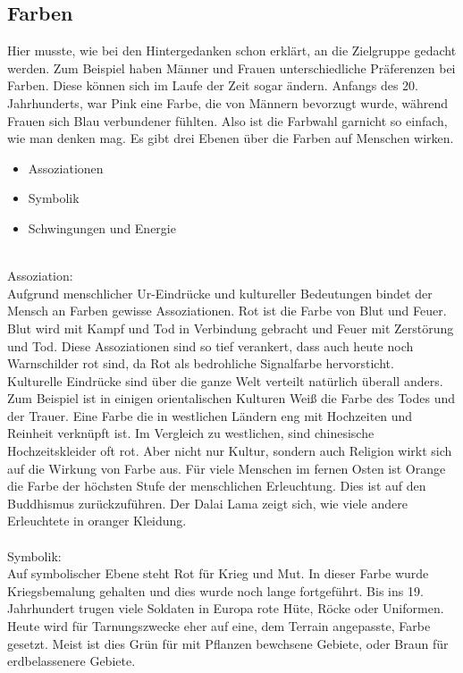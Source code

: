 \subsection{Farben}
Hier musste, wie bei den Hintergedanken schon erklärt, an die Zielgruppe gedacht werden. Zum Beispiel haben Männer und Frauen unterschiedliche Präferenzen bei Farben. Diese können sich im Laufe der Zeit sogar ändern. Anfangs des 20. Jahrhunderts, war Pink eine Farbe, die von Männern bevorzugt wurde, während Frauen sich Blau verbundener fühlten.\cite{farbgeschlecht} Also ist die Farbwahl garnicht so einfach, wie man denken mag. Es gibt drei Ebenen über die Farben auf Menschen wirken.\cite{farbwirkung}
\begin{itemize}
\item Assoziationen
\item Symbolik
\item Schwingungen und Energie 
\end{itemize}
\leavevmode \\
Assoziation\cite{farbwirkung}:
\leavevmode \\
Aufgrund menschlicher Ur-Eindrücke und kultureller Bedeutungen bindet der Mensch an Farben gewisse Assoziationen. Rot ist die Farbe von Blut und Feuer. Blut wird mit Kampf und Tod in Verbindung gebracht und Feuer mit Zerstörung und Tod. Diese Assoziationen sind so tief verankert, dass auch heute noch Warnschilder rot sind, da Rot als bedrohliche Signalfarbe hervorsticht.
\leavevmode \\
Kulturelle Eindrücke sind über die ganze Welt verteilt natürlich überall anders. Zum Beispiel ist in einigen orientalischen Kulturen Weiß die Farbe des Todes und der Trauer. Eine Farbe die in westlichen Ländern eng mit Hochzeiten und Reinheit verknüpft ist. Im Vergleich zu westlichen, sind chinesische Hochzeitskleider oft rot. Aber nicht nur Kultur, sondern auch Religion wirkt sich auf die Wirkung von Farbe aus. Für viele Menschen im fernen Osten ist Orange die Farbe der höchsten Stufe der menschlichen Erleuchtung. Dies ist auf den Buddhismus zurückzuführen. Der Dalai Lama zeigt sich, wie viele andere Erleuchtete in oranger Kleidung.\cite{farbkultur}
\leavevmode \\
\leavevmode \\
Symbolik\cite{farbwirkung}:
\leavevmode \\
Auf symbolischer Ebene steht Rot für Krieg und Mut. In dieser Farbe wurde Kriegsbemalung gehalten und dies wurde noch lange fortgeführt. Bis ins 19. Jahrhundert trugen viele Soldaten in Europa rote Hüte, Röcke oder Uniformen. Heute wird für Tarnungszwecke eher auf eine, dem Terrain angepasste, Farbe gesetzt. Meist ist dies Grün für mit Pflanzen bewchsene Gebiete, oder Braun für erdbelassenere Gebiete.
